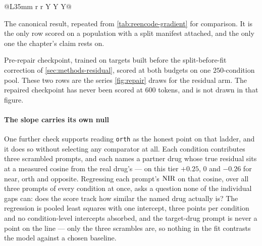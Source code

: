 \begin{table}[htbp]
\begin{fullwidth}
\begin{threeparttable}
\begin{tabularx}{\linewidth}{@{}L{35mm} r r Y Y Y@{}}
  \end{tabularx}
  \begin{tablenotes}[flushleft]
  \item[a] The canonical result, repeated from \cref{tab:reencode-gradient} for
  comparison. It is the only row scored on a population with a split manifest
  attached, and the only one the chapter's claim rests on.
  \item[b] Pre-repair checkpoint, trained on targets built before the
  split-before-fit correction of \cref{sec:methods-residual}, scored at both
  budgets on one $\num{250}$-condition pool. These two rows are the series
  \cref{fig:repair} draws for the residual arm. The repaired checkpoint has never
  been scored at $600$ tokens, and is not drawn in that figure.
  \end{tablenotes}
  \end{threeparttable}
  \end{fullwidth}
  \end{table}

  \paragraph{The slope carries its own null}
  One further check supports reading \texttt{orth} as the honest point on that
ladder, and it does so without selecting any comparator at all. Each condition
contributes three scrambled prompts, and each names a partner drug whose true
residual sits at a measured cosine from the real drug's --- on this tier
$+0.25$, $0$ and $-0.26$ for near, orth and opposite.  Regressing each prompt's $\textrm{NIR}$ on
that cosine, over all three prompts of every condition at once, asks a question
none of the individual gaps can: does the score track how similar the named drug
actually is? The regression is pooled least squares with one intercept, three
points per condition and no condition-level intercepts absorbed, and the
target-drug prompt is never a point on the line --- only the three scrambles
are, so nothing in the fit contrasts the model against a chosen baseline.

